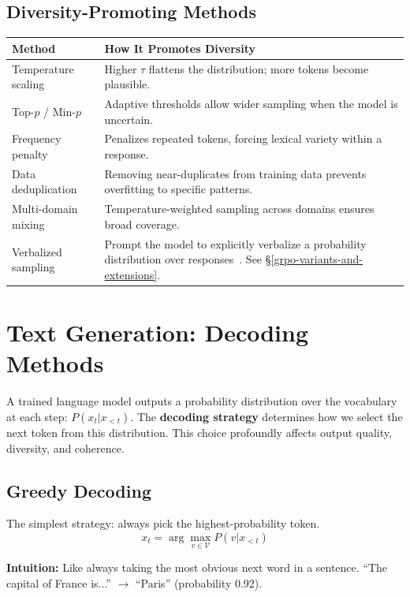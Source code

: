 \subsection{Diversity-Promoting Methods}
\label{diversity-promoting-methods}

\begin{tabular}{@{}lp{11cm}@{}}
\toprule
\textbf{Method} & \textbf{How It Promotes Diversity} \\
\midrule
Temperature scaling & Higher $\tau$ flattens the distribution; more tokens become plausible. \\
Top-$p$ / Min-$p$ & Adaptive thresholds allow wider sampling when the model is uncertain. \\
Frequency penalty & Penalizes repeated tokens, forcing lexical variety within a response. \\
Data deduplication & Removing near-duplicates from training data prevents overfitting to specific patterns. \\
Multi-domain mixing & Temperature-weighted sampling across domains ensures broad coverage. \\
Verbalized sampling & Prompt the model to explicitly verbalize a probability distribution over responses~\cite{zhang2025verbalized}. See §\ref{grpo-variants-and-extensions}. \\
\bottomrule
\end{tabular}

\section{Text Generation: Decoding Methods}
\label{text-generation-decoding-methods}

A trained language model outputs a probability distribution over the vocabulary at each step: $P(x_t | x_{<t})$. The \textbf{decoding strategy} determines how we select the next token from this distribution. This choice profoundly affects output quality, diversity, and coherence.

\subsection{Greedy Decoding}
\label{greedy-decoding}

The simplest strategy: always pick the highest-probability token. 
\[
x_t = \arg\max_{v \in \mathcal{V}} P(v | x_{<t})
\]

\textbf{Intuition:} Like always taking the most obvious next word in a sentence. ``The capital of France is...'' $\to$ ``Paris'' (probability 0.92).

